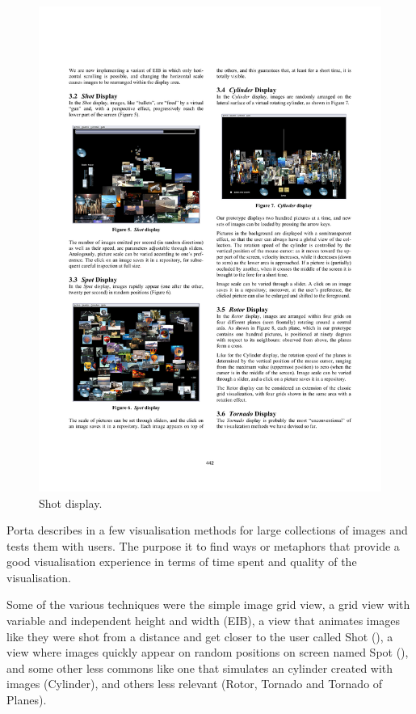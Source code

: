 \begin{figure}[ht]
\begin{minipage}[b]{0.5\textwidth}
		\includegraphics[width=\textwidth]{imgs-RelatedWork/Porta-shot}
		\caption{Shot display.}
		\label{fig:porta-shot}
	\end{minipage}
\end{figure}

Porta describes in \cite{Porta:2006p416} a few visualisation methods for large collections of images and tests them with users. The purpose it to find ways or metaphors that provide a good visualisation experience in terms of time spent and quality of the visualisation.

Some of the various techniques were the simple image grid view, a grid view with variable and independent height and width (EIB), a view that animates images like they were shot from a distance and get closer to the user called Shot (), a view where images quickly appear on random positions on screen named Spot (), and some other less commons like one that simulates an cylinder created with images (Cylinder), and others less relevant (Rotor, Tornado and Tornado of Planes).

